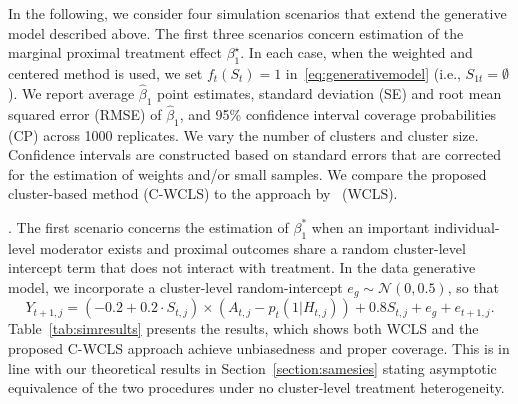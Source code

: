 \documentclass[12pt]{article}
\newcommand{\zw}[1]{\textcolor{blue}{[\textit{ZW: #1}]}}
\newcommand{\hs}[3]{\textcolor{red}{[\textit{HS: #1}]}}
\begin{document}
In the following, we consider four simulation scenarios that extend the generative model described above. The first three scenarios concern estimation of the marginal proximal treatment effect $\beta_1^\star$. In each case, when the weighted and centered method is used, we set $f_t(S_t)=1$ in~\eqref{eq:generativemodel} (i.e., $S_{1t} = \emptyset$). We report average $\hat{\beta}_1$ point estimates, standard deviation (SE) and root mean squared error (RMSE) of $\hat{\beta}_1$, and 95\% confidence interval coverage probabilities (CP) across 1000 replicates. We vary the number of clusters and cluster size.  Confidence intervals are constructed based on standard errors that are corrected for the estimation of weights and/or small samples.  We compare the proposed cluster-based method (C-WCLS) to the approach by~\cite{Boruvkaetal} (WCLS).


. The first scenario concerns the estimation of $\beta_1^*$ when an important individual-level moderator exists and proximal outcomes share a random cluster-level intercept term that does not interact with treatment. In the data generative model, we incorporate a cluster-level random-intercept $e_g \sim \mathcal{N}(0,0.5)$, so that
\begin{equation*}
Y_{t+1,j} = (-0.2 + 0.2 \cdot S_{t,j}) \times (A_{t,j} -p_t(1|H_{t,j})) + 0.8 S_{t,j} + e_g +e_{t+1,j}.
\end{equation*}
Table~\ref{tab:simresults} presents the results, which shows both WCLS and the proposed C-WCLS approach achieve unbiasedness and proper coverage. This is in line with our theoretical results in    Section~\ref{section:samesies} stating asymptotic equivalence of the two procedures under no cluster-level treatment heterogeneity.
\end{document}
